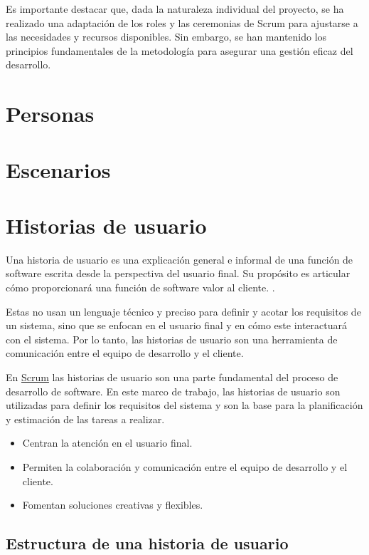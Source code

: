 Es importante destacar que, dada la naturaleza individual del proyecto, se ha realizado una adaptación de los roles y las ceremonias de Scrum para ajustarse a las necesidades y recursos disponibles. Sin embargo, se han mantenido los principios fundamentales de la metodología para asegurar una gestión eficaz del desarrollo.

\section{Personas}

\section{Escenarios}

\section{Historias de usuario}

Una historia de usuario es una explicación general e informal de una función de software escrita desde la perspectiva
del usuario final. Su propósito es articular cómo proporcionará una función de software valor al cliente. \cite{atlassian_user_stories}.

Estas no usan un lenguaje técnico y preciso para definir y acotar los requisitos de un sistema, sino que se enfocan en
el usuario final y en cómo este interactuará con el sistema. Por lo tanto, las historias de usuario son una herramienta
de comunicación entre el equipo de desarrollo y el cliente.

En \hyperlink{scrum}{Scrum} las historias de usuario son una parte fundamental del proceso de desarrollo de software. En
este marco de trabajo, las historias de usuario son utilizadas para definir los requisitos del sistema y son la base para
la planificación y estimación de las tareas a realizar.
\newline\newline
{}
\begin{itemize}
    \item Centran la atención en el usuario final.
    \item Permiten la colaboración y comunicación entre el equipo de desarrollo y el cliente.
    \item Fomentan soluciones creativas y flexibles.
\end{itemize}
\subsection{Estructura de una historia de usuario}

